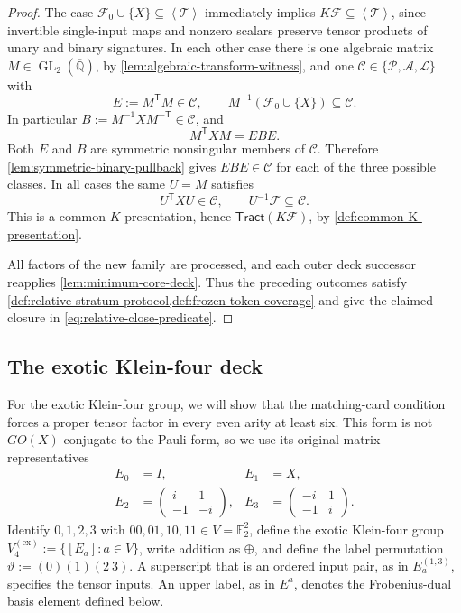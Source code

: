 \documentclass[11pt,letterpaper,onecolumn]{article}
\theoremstyle{plain}
\theoremstyle{definition}
\theoremstyle{remark}
\newcommand{\AlgNums}{\overline{\mathbb Q}}
\newcommand{\Ftwo}{\mathbb F_2}
\newcommand{\cF}{\mathcal F}
\newcommand{\cA}{\mathscr A}
\newcommand{\cP}{\mathscr P}
\newcommand{\cL}{\mathscr L}
\newcommand{\cT}{\mathscr T}
\newcommand{\cC}{\mathscr C}
\newcommand{\angles}[1]{\left\langle #1\right\rangle}
\newcommand{\Tract}{\mathsf{Tract}}
\newcommand{\KleinEx}{{V_4^{(\mathrm{ex})}}}
\newcommand{\GL}{\operatorname{GL}}
\begin{document}
\begin{proof}
The case \(\cF_0\cup\{X\}\subseteq\angles{\cT}\) immediately implies
\(K\cF\subseteq\angles{\cT}\), since invertible single-input maps and
nonzero scalars preserve tensor products of unary and binary signatures.
In each other case there is one algebraic matrix
\(M\in\GL_2(\AlgNums)\), by
\cref{lem:algebraic-transform-witness}, and one
\(\cC\in\{\cP,\cA,\cL\}\) with
\[
 E:=M^{\mathsf T}M\in\cC,
 \qquad M^{-1}(\cF_0\cup\{X\})\subseteq\cC.
\]
In particular \(B:=M^{-1}XM^{-\mathsf T}\in\cC\), and
\[
 M^{\mathsf T}XM=EBE.
\]
Both \(E\) and \(B\) are symmetric nonsingular members of \(\cC\).
Therefore \cref{lem:symmetric-binary-pullback} gives
\(EBE\in\cC\) for each of the three possible classes.
In all cases the same \(U=M\) satisfies
\[
 U^{\mathsf T}XU\in\cC,
 \qquad U^{-1}\cF\subseteq\cC.
\]
This is a common \(K\)-presentation, hence
\(\Tract(K\cF)\), by \cref{def:common-K-presentation}.

All factors of the new family are processed, and each outer deck
successor reapplies \cref{lem:minimum-core-deck}. Thus the preceding
outcomes satisfy \cref{def:relative-stratum-protocol,def:frozen-token-coverage}
and give the claimed closure in \cref{eq:relative-close-predicate}.
\end{proof}

\subsection{The exotic Klein-four deck}
\label{sec:exotic-v4-deck}

For the exotic Klein-four group, we will show that the matching-card
condition forces a proper tensor factor in every even arity at least six. This form
is not \(GO(X)\)-conjugate to the Pauli form, so we use its original
matrix representatives
\begin{equation}
\begin{aligned}
 E_0&=I,&
 E_1&=X,\\
 E_2&=\begin{pmatrix}i&1\\-1&-i\end{pmatrix},&
 E_3&=\begin{pmatrix}-i&1\\-1&i\end{pmatrix}.
\end{aligned}
\label{eq:exotic-v4-basis}
\end{equation}
Identify \(0,1,2,3\) with \(00,01,10,11\in V=\Ftwo^2\), define the exotic
Klein-four group \(\KleinEx:=\{[E_a]:a\in V\}\), write
addition as \(\oplus\), and define the label permutation
\(\vartheta:=(0)(1)(2\ 3)\).  A superscript that is an ordered input pair,
as in \(E_a^{(1,3)}\), specifies the tensor inputs. An upper label, as in
\(E^a\), denotes the Frobenius-dual basis element defined below.
\end{document}
